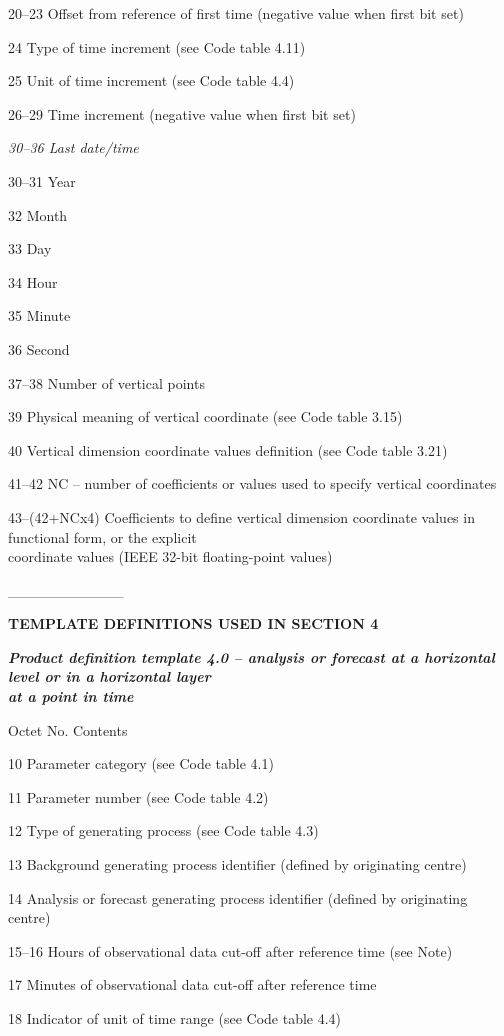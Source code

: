 20--23 Offset from reference of first time (negative value when first bit set)

24 Type of time increment (see Code table 4.11)

25 Unit of time increment (see Code table 4.4)

26--29 Time increment (negative value when first bit set)

\emph{30--36 Last date/time}

30--31 Year

32 Month

33 Day

34 Hour

35 Minute

36 Second

37--38 Number of vertical points

39 Physical meaning of vertical coordinate (see Code table 3.15)

40 Vertical dimension coordinate values definition (see Code table 3.21)

41--42 NC -- number of coefficients or values used to specify vertical coordinates

43--(42+NCx4) Coefficients to define vertical dimension coordinate values in functional form, or the explicit\\
coordinate values (IEEE 32-bit floating-point values)

\_\_\_\_\_\_\_\_\_\_\_

\textbf{TEMPLATE DEFINITIONS USED IN SECTION 4}

\emph{\textbf{Product definition template 4.0 -- analysis or forecast at a horizontal level or in a horizontal layer\\
at a point in time}}

Octet No. Contents

10 Parameter category (see Code table 4.1)

11 Parameter number (see Code table 4.2)

12 Type of generating process (see Code table 4.3)

13 Background generating process identifier (defined by originating centre)

14 Analysis or forecast generating process identifier (defined by originating centre)

15--16 Hours of observational data cut-off after reference time (see Note)

17 Minutes of observational data cut-off after reference time

18 Indicator of unit of time range (see Code table 4.4)

